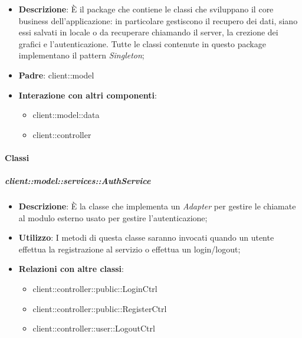\begin{itemize}
	\item \textbf{Descrizione}: È il package che contiene le classi che sviluppano il core business dell'applicazione: in particolare gestiscono il recupero dei dati, siano essi salvati in locale o da recuperare chiamando il server, la crezione dei grafici e l'autenticazione.
	Tutte le classi contenute in questo package implementano il pattern \emph{Singleton};
	\item \textbf{Padre}: client::model
	\item \textbf{Interazione con altri componenti}:
		\begin{itemize}
			\item client::model::data
			\item client::controller
		\end{itemize}
\end{itemize}

	\paragraph{Classi} %

		\subparagraph{client::model::services::AuthService} %
		\label{subp:client_model_services_authservice}
			\begin{itemize}
				\item \textbf{Descrizione}: È la classe che implementa un \emph{Adapter} per gestire le chiamate al modulo esterno usato per gestire l'autenticazione;
				\item \textbf{Utilizzo}: I metodi di questa classe saranno invocati quando un utente effettua la registrazione al servizio o effettua un login/logout;
				\item \textbf{Relazioni con altre classi}: 					
					\begin{itemize}
						\item client::controller::public::LoginCtrl
						\item client::controller::public::RegisterCtrl
						\item client::controller::user::LogoutCtrl
					\end{itemize}
			\end{itemize}
		
